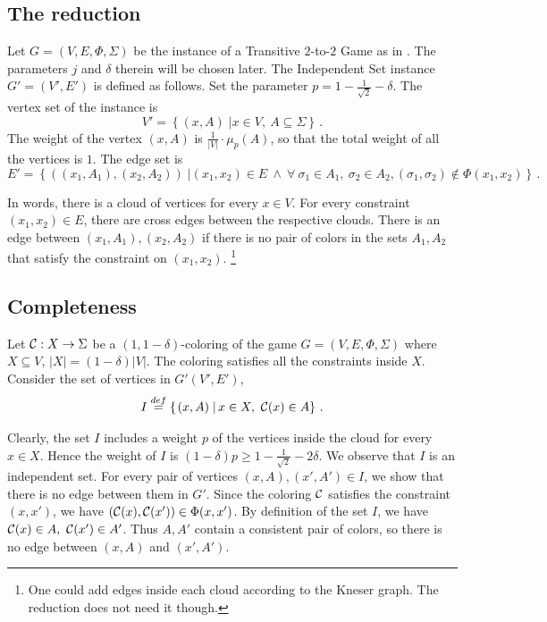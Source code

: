 \documentclass{toc}
\newcommand\sett[2]{\left\{ \left. #1 \;\right\vert #2 \right\}}
\newcommand\defeq{\stackrel{def}{=}}
\renewcommand\geq{\geqslant}
\begin{document}
\subsection{The reduction}

Let $G=(V,E,\Phi,\Sigma)$ be the instance of a Transitive $2$-to-$2$ Game as in . The parameters $j$ and $\delta$ therein will be chosen later.
The Independent Set instance $G'=(V',E')$ is defined as follows. Set the parameter $p=1-\frac{1}{\sqrt{2}}-\delta$.
The vertex set of the instance is
\[
V'= \sett{(x,A)}{ x \in V, ~A\subseteq \Sigma}\,.%
\]
The weight of the vertex $(x,A)$ is  $\frac{1}{|V|} \cdot \mu_p(A)$, so that the total weight of all the vertices is $1$. The edge set is
\[
E' = \sett{((x_1,A_1),(x_2,A_2))}{ (x_1,x_2)\in E \ \land \ \forall  ~\sigma_1 \in A_1,
 \ \sigma_2 \in A_2,  (\sigma_1, \sigma_2) \not\in \Phi(x_1, x_2)}\,.%
\]

In words, there is a cloud of vertices for every $x \in V$.
For every constraint $(x_1, x_2) \in E$, there are cross edges between the
respective clouds.  %
There is an edge between $(x_1,A_1),(x_2,A_2)$ if there is no pair of
colors in the sets $A_1,A_2$ that satisfy the constraint on $(x_1,x_2)$. \footnote{ One could add edges inside each cloud according to the
 Kneser graph. The reduction does not need it though.}


\subsection{Completeness}
Let ${\cal C}: X \to \Sigma$ be a $(1,1-\delta)$-coloring of the game  $G=(V,E,\Phi,\Sigma)$ where $X \subseteq V$, $|X|=(1-\delta)|V|$. The coloring
satisfies all the constraints inside $X$. Consider the set of vertices in $G'(V',E')$,
\[
I\defeq\sett{(x,A)}{x\in X, ~ {\cal C}(x)\in A}\,.%
\]

Clearly, the set $I$ includes a weight $p$ of the vertices inside the cloud for every $x \in X$. Hence the weight of $I$ is
$(1-\delta) p \geq 1-\frac{1}{\sqrt{2}} - 2\delta $. We observe that
$I$ is an independent set. For every pair of vertices
 $(x,A),(x',A')\in I$, we show that there is no edge between them in $G'$. Since the coloring
${\cal C}$ satisfies the constraint $(x,x')$, we have $({\cal C}(x), {\cal C}(x')) \in \Phi(x,x')$.
By definition of the set $I$, we have  ${\cal C}(x) \in A,  ~{\cal C}(x') \in A'$.  Thus $A,A'$ contain a consistent pair of colors,
so there is no edge between $(x,A)$ and $(x',A')$.
\end{document}
